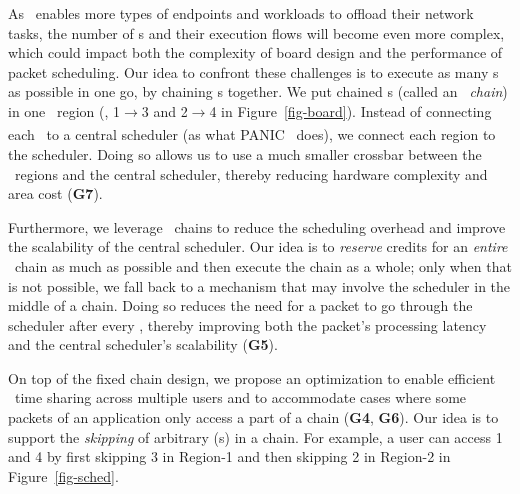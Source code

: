 \fi

As \snic\ enables more types of endpoints and workloads to offload their network tasks, the number of \nt{}s and their execution flows will become even more complex, which could impact both the complexity of board design and the performance of packet scheduling.
Our idea to confront these challenges is to execute as many \nt{}s as possible in one go, by chaining \nt{}s together.
We put chained \nt{}s (called an {\em \nt\ chain}) in one \nt\ region (\eg, \nt{}1$\xrightarrow[]{}$\nt{}3 and \nt{}2$\xrightarrow[]{}$\nt{}4 in Figure~\ref{fig-board}).
Instead of connecting each \nt\ to a central scheduler (as what PANIC~\cite{panic-osdi20} does), we connect each region to the scheduler.
Doing so allows us to use a much smaller crossbar between the \nt\ regions and the central scheduler, thereby reducing hardware complexity and area cost (\textbf{G7}).



Furthermore, we leverage \nt\ chains to reduce the scheduling overhead and improve the scalability of the central scheduler.
Our idea is to {\em reserve} credits for an {\em entire} \nt\ chain as much as possible and then execute the chain as a whole; only when that is not possible, we fall back to a mechanism that may involve the scheduler in the middle of a chain. 
Doing so reduces the need for a packet to go through the scheduler after every \nt, thereby improving both the packet's processing latency and the central scheduler's scalability (\textbf{G5}).

On top of the fixed chain design, we propose an optimization to enable efficient \nt\ time sharing across multiple users and to accommodate cases where some packets of an application only access a part of a chain (\textbf{G4}, \textbf{G6}).
Our idea is to support the {\em skipping} of arbitrary \nt(s) in a chain.
For example, a user can access \nt{}1 and \nt{}4 by first skipping \nt{}3 in Region-1 and then skipping \nt{}2 in Region-2 in Figure~\ref{fig-sched}.



